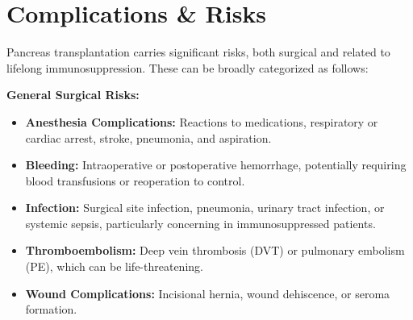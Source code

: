 \section*{Complications \& Risks}
Pancreas transplantation carries significant risks, both surgical and related to lifelong immunosuppression. These can be broadly categorized as follows:

\textbf{General Surgical Risks:}
\begin{itemize}
  \item \textbf{Anesthesia Complications:} Reactions to medications, respiratory or cardiac arrest, stroke, pneumonia, and aspiration.
  \item \textbf{Bleeding:} Intraoperative or postoperative hemorrhage, potentially requiring blood transfusions or reoperation to control.
  \item \textbf{Infection:} Surgical site infection, pneumonia, urinary tract infection, or systemic sepsis, particularly concerning in immunosuppressed patients.
  \item \textbf{Thromboembolism:} Deep vein thrombosis (DVT) or pulmonary embolism (PE), which can be life-threatening.
  \item \textbf{Wound Complications:} Incisional hernia, wound dehiscence, or seroma formation.
\end{itemize}

